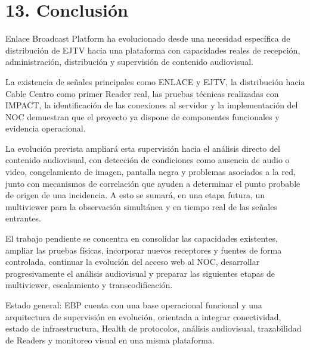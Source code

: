 \section{13. Conclusión}
Enlace Broadcast Platform ha evolucionado desde una necesidad específica de distribución de EJTV hacia una plataforma con capacidades reales de recepción, administración, distribución y supervisión de contenido audiovisual.

La existencia de señales principales como ENLACE y EJTV, la distribución hacia Cable Centro como primer Reader real, las pruebas técnicas realizadas con IMPACT, la identificación de las conexiones al servidor y la implementación del NOC demuestran que el proyecto ya dispone de componentes funcionales y evidencia operacional.

La evolución prevista ampliará esta supervisión hacia el análisis directo del contenido audiovisual, con detección de condiciones como ausencia de audio o video, congelamiento de imagen, pantalla negra y problemas asociados a la red, junto con mecanismos de correlación que ayuden a determinar el punto probable de origen de una incidencia. A esto se sumará, en una etapa futura, un multiviewer para la observación simultánea y en tiempo real de las señales entrantes.

El trabajo pendiente se concentra en consolidar las capacidades existentes, ampliar las pruebas físicas, incorporar nuevos receptores y fuentes de forma controlada, continuar la evolución del acceso web al NOC, desarrollar progresivamente el análisis audiovisual y preparar las siguientes etapas de multiviewer, escalamiento y transcodificación.

\begin{callout}Estado general: EBP cuenta con una base operacional funcional y una arquitectura de supervisión en evolución, orientada a integrar conectividad, estado de infraestructura, Health de protocolos, análisis audiovisual, trazabilidad de Readers y monitoreo visual en una misma plataforma.\end{callout}
